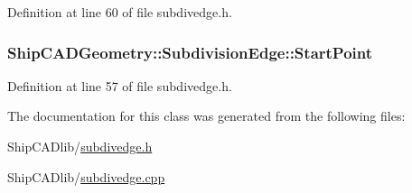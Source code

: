 Definition at line 60 of file subdivedge.\-h.

\hypertarget{classShipCADGeometry_1_1SubdivisionEdge_add30db0d6a7aac1c8f081012f3cccf03}{
\subsubsection[{Start\-Point}]{ Ship\-C\-A\-D\-Geometry\-::\-Subdivision\-Edge\-::\-Start\-Point\hspace{0.3cm}{\ttfamily [read]}}}\label{classShipCADGeometry_1_1SubdivisionEdge_add30db0d6a7aac1c8f081012f3cccf03}


Definition at line 57 of file subdivedge.\-h.



The documentation for this class was generated from the following files\-:\begin{DoxyCompactItemize}
\item 
Ship\-C\-A\-Dlib/\hyperlink{subdivedge_8h}{subdivedge.\-h}\item 
Ship\-C\-A\-Dlib/\hyperlink{subdivedge_8cpp}{subdivedge.\-cpp}\end{DoxyCompactItemize}
